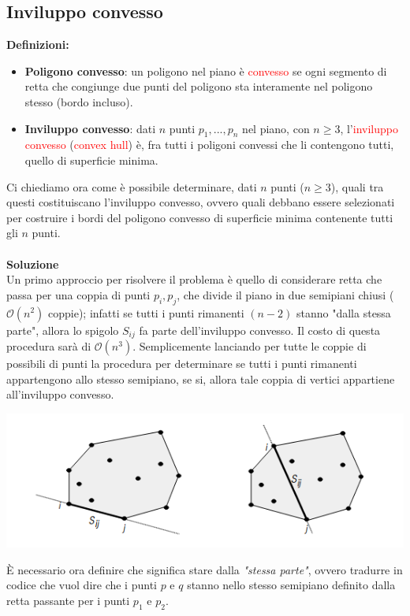 \documentclass[../cheatSheetAlgoritmi.tex]{subfiles}
\begin{document}
\subsection{Inviluppo convesso}
\textbf{Definizioni:}
\begin{itemize}
	\item \textbf{Poligono convesso}: un poligono nel piano è \textcolor{red}{convesso} se ogni segmento di retta che congiunge due punti del poligono sta interamente nel poligono stesso (bordo incluso).
	\item \textbf{Inviluppo convesso}: dati $n$ punti $p_1, . . . , p_n$ nel piano, con $n \geq 3$, l'\textcolor{red}{inviluppo convesso} (\textcolor{red}{convex hull}) è, fra tutti i poligoni convessi che li contengono tutti, quello di superficie minima.
\end{itemize}
Ci chiediamo ora come è possibile determinare, dati $n$ punti ($n \geq 3$), quali tra questi costituiscano l'inviluppo convesso, ovvero quali debbano essere selezionati per costruire i bordi del poligono convesso di superficie minima contenente tutti gli $n$ punti. \\\\
\textbf{Soluzione} \\
Un primo approccio per risolvere il problema è quello di considerare retta che passa per una coppia di punti $p_i, p_j$, che divide il piano in due semipiani chiusi ($\mathcal{O}(n^2)$ coppie); infatti se tutti i punti rimanenti $(n - 2)$ stanno "dalla stessa parte", allora lo spigolo $S_{ij}$ fa parte dell'inviluppo convesso. Il costo di questa procedura sarà di $\mathcal{O}(n^3)$. Semplicemente lanciando per tutte le coppie di possibili di punti la procedura per determinare se tutti i punti rimanenti appartengono allo stesso semipiano, se si, allora tale coppia di vertici appartiene all'inviluppo convesso.
\begin{center}
	\includegraphics{../img/backtracking_inviluppo_convesso}
\end{center}
È necessario ora definire che significa stare dalla \emph{"stessa parte"}, ovvero tradurre in codice che vuol dire che i punti $p$ e $q$ stanno nello stesso semipiano definito dalla retta passante per i punti $p_1$ e $p_2$. \\
\end{document}
